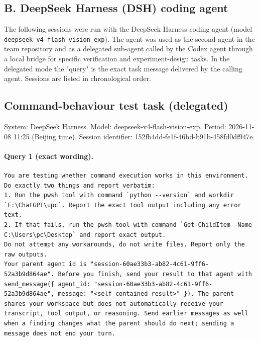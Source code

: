 \documentclass[UTF8,10pt]{ctexart}
\begin{document}
\subsection*{B. DeepSeek Harness (DSH) coding agent}
The following sessions were run with the DeepSeek Harness coding agent (model \texttt{deepseek-v4-flash-vision-exp}). The agent was used as the second agent in the team repository and as a delegated sub-agent called by the Codex agent through a local bridge for specific verification and experiment-design tasks. In the delegated mode the "query" is the exact task message delivered by the calling agent. Sessions are listed in chronological order.

\subsection*{Command-behaviour test task (delegated)}
\noindent System: DeepSeek Harness. Model: deepseek-v4-flash-vision-exp. Period: 2026-11-08 11:25 (Beijing time). Session identifier: 152fb4dd-fe1f-46bd-b91b-458fd0df947e.

\paragraph{Query 1 (exact wording).}
\begin{Verbatim}[breaklines=true,breakanywhere=true,fontsize=\scriptsize,frame=single,framesep=2pt]
You are testing whether command execution works in this environment. Do exactly two things and report verbatim:
1. Run the pwsh tool with command `python --version` and workdir `F:\ChatGPT\upc`. Report the exact tool output including any error text.
2. If that fails, run the pwsh tool with command `Get-ChildItem -Name C:\Users\pc\Desktop` and report exact output.
Do not attempt any workarounds, do not write files. Report only the raw outputs.
Your parent agent id is "session-60ae33b3-ab82-4c61-9ff6-52a3b9d864ae". Before you finish, send your result to that agent with send_message({ agent_id: "session-60ae33b3-ab82-4c61-9ff6-52a3b9d864ae", message: "<self-contained result>" }). The parent shares your workspace but does not automatically receive your transcript, tool output, or reasoning. Send earlier messages as well when a finding changes what the parent should do next; sending a message does not end your turn.
\end{Verbatim}
\end{document}
